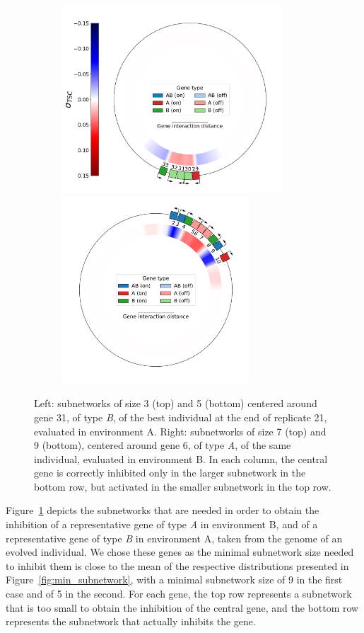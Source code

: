 \begin{figure}[H]
  \begin{subfigure}[t]{\textwidth}
    \centering
    \includegraphics[height=7cm]{ploscb/img/sub_5_genes_29_env_A.pdf}
    \hspace{-0.5cm}
    \includegraphics[height=7cm]{ploscb/img/sub_9_genes_02_env_B.pdf}
  \end{subfigure}
  \caption{Left: subnetworks of size 3 (top) and 5 (bottom) centered around gene 31, of type \emph{B}, of the best individual at the end of replicate 21, evaluated in environment A.
  Right: subnetworks of size 7 (top) and 9 (bottom), centered around gene 6, of type \emph{A}, of the same individual, evaluated in environment B.
  In each column, the central gene is correctly inhibited only in the larger subnetwork in the bottom row, but activated in the smaller subnetwork in the top row.}
  \label{fig:subnetwork_examples}
\end{figure}

Figure~\ref{fig:subnetwork_examples} depicts the subnetworks that are needed in order to obtain the inhibition of a representative gene of type \emph{A} in environment B, and of a representative gene of type \emph{B} in environment A, taken from the genome of an evolved individual.
We chose these genes as the minimal subnetwork size needed to inhibit them is close to the mean of the respective distributions presented in Figure~\ref{fig:min_subnetwork}, with a minimal subnetwork size of 9 in the first case and of 5 in the second.
For each gene, the top row represents a subnetwork that is too small to obtain the inhibition of the central gene, and the bottom row represents the subnetwork that actually inhibits the gene.

